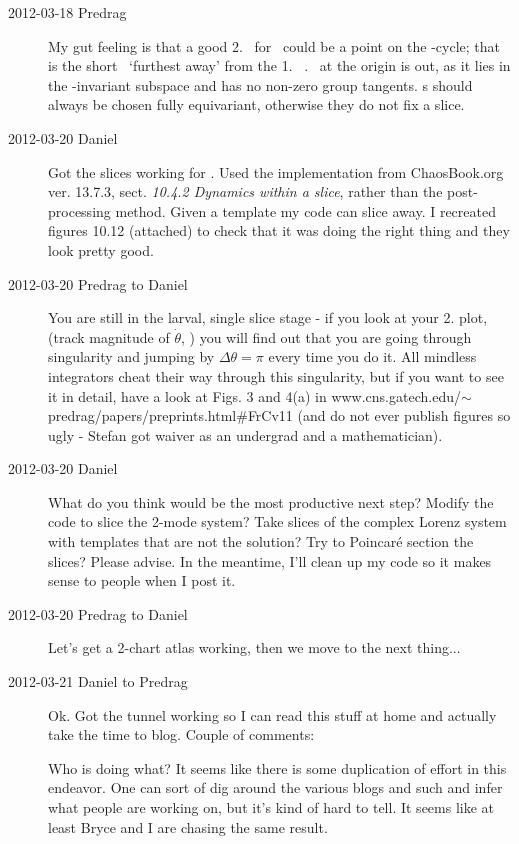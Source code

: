 \begin{description}
\item[2012-03-18 Predrag] My gut feeling is that a good 2. \template\ for
\cLf\ could be a point on the -cycle; that is the short \rpo\
`furthest away' from the 1. \template\ . \Eqv\ at the origin is
out, as it lies in the \Group-invariant subspace and has no non-zero
group tangents. \Template s should always be chosen fully equivariant,
otherwise they do not fix a slice.

\item[2012-03-20 Daniel]
Got the slices working for \cLf. Used the implementation from
ChaosBook.org ver. 13.7.3, sect. \emph{10.4.2 Dynamics within a slice},
rather than the post-processing method. Given a template my code can
slice away. I recreated figures 10.12 (attached) to check that it was
doing the right thing and they look pretty good.


\item[2012-03-20 Predrag  to Daniel]
You are still in the larval, single slice stage - if you look at your 2.
plot, (track magnitude of $\dot{\theta}$, \etc) you will find out that
you are going through singularity and jumping by $\Delta \theta = \pi$
every time you do it. All mindless integrators cheat their way through
this singularity, but if you want to see it in detail, have a look at
Figs. 3 and 4(a) in
{www.cns.gatech.edu/$\sim$predrag/papers/preprints.html\#FrCv11} (and do
not ever publish figures so ugly - Stefan\rf{FrCv11} got waiver as an
undergrad and a mathematician).

\item[2012-03-20 Daniel]
What do you think would be the most productive next step? Modify the code
to slice the 2-mode system? Take slices of the complex Lorenz system with
templates that are not the {\eqv} solution? Try to Poincar\'e
section the slices? Please advise. In the meantime, I'll clean up my code
so it makes sense to people when I post it.

\item[2012-03-20 Predrag  to Daniel] Let's get a 2-chart atlas working, then
we move to the next thing...

\item[2012-03-21 Daniel  to Predrag] Ok. Got the tunnel working so I can
read this stuff at home and actually take the time to blog. Couple of
comments:

Who is doing what? It seems like there is some duplication of effort in
this endeavor. One can sort of dig around the various blogs and such and
infer what people are working on, but it's kind of hard to tell. It seems
like at least Bryce and I are chasing the same result.


\end{description}
